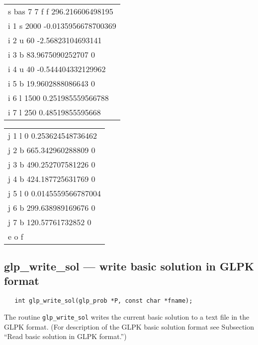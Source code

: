 \begin{center}
\footnotesize\tt
\begin{tabular}{l@{\hspace*{50pt}}}
s bas 7 7 f f 296.216606498195   \\
i 1 s 2000 -0.0135956678700369   \\
i 2 u 60 -2.56823104693141       \\
i 3 b 83.9675090252707 0         \\
i 4 u 40 -0.544404332129962      \\
i 5 b 19.9602888086643 0         \\
i 6 l 1500 0.251985559566788     \\
i 7 l 250 0.48519855595668       \\
\end{tabular}
\begin{tabular}{|@{\hspace*{50pt}}l}
j 1 l 0 0.253624548736462        \\
j 2 b 665.342960288809 0         \\
j 3 b 490.252707581226 0         \\
j 4 b 424.187725631769 0         \\
j 5 l 0 0.0145559566787004       \\
j 6 b 299.638989169676 0         \\
j 7 b 120.57761732852 0          \\
e o f                            \\
\end{tabular}
\end{center}

\newpage

\subsection{glp\_write\_sol --- write basic solution in GLPK format}

\synopsis

\begin{verbatim}
   int glp_write_sol(glp_prob *P, const char *fname);
\end{verbatim}

\description

The routine \verb|glp_write_sol| writes the current basic solution to
a text file in the GLPK format. (For description of the GLPK basic
solution format see Subsection ``Read basic solution in GLPK format.'')

